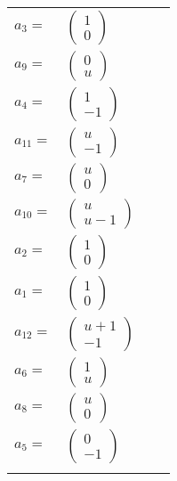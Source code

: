 \documentclass[1p]{elsarticle_modified}
\theoremstyle{definition}
\begin{document}
\begin{tabular}{m{7pt} m{180pt} m{7pt} m{180pt} }
\flushright $a_{3}=$&$\begin{pmatrix}1\\0\end{pmatrix}$ \\
\flushright $a_{9}=$&$\begin{pmatrix}0\\u\end{pmatrix}$ \\
\flushright $a_{4}=$&$\begin{pmatrix}1\\-1\end{pmatrix}$ \\
\flushright $a_{11}=$&$\begin{pmatrix}u\\-1\end{pmatrix}$ \\
\flushright $a_{7}=$&$\begin{pmatrix}u\\0\end{pmatrix}$ \\
\flushright $a_{10}=$&$\begin{pmatrix}u\\u-1\end{pmatrix}$ \\
\flushright $a_{2}=$&$\begin{pmatrix}1\\0\end{pmatrix}$ \\
\flushright $a_{1}=$&$\begin{pmatrix}1\\0\end{pmatrix}$ \\
\flushright $a_{12}=$&$\begin{pmatrix}u+1\\-1\end{pmatrix}$ \\
\flushright $a_{6}=$&$\begin{pmatrix}1\\u\end{pmatrix}$ \\
\flushright $a_{8}=$&$\begin{pmatrix}u\\0\end{pmatrix}$ \\
\flushright $a_{5}=$&$\begin{pmatrix}0\\-1\end{pmatrix}$\\&\end{tabular}
\end{document}
